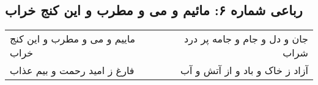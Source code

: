 \begin{center}
\section*{رباعی شماره ۶: مائیم و می و مطرب و این کنج خراب}
\label{sec:sh006}
\begin{longtable}{l p{0.5cm} r}
ماییم و می و مطرب و این کنج خراب
&&
جان و دل و جام و جامه پر درد شراب
\\
فارغ ز امید رحمت و بیم عذاب
&&
آزاد ز خاک و باد و از آتش و آب
\\
\end{longtable}
\end{center}
